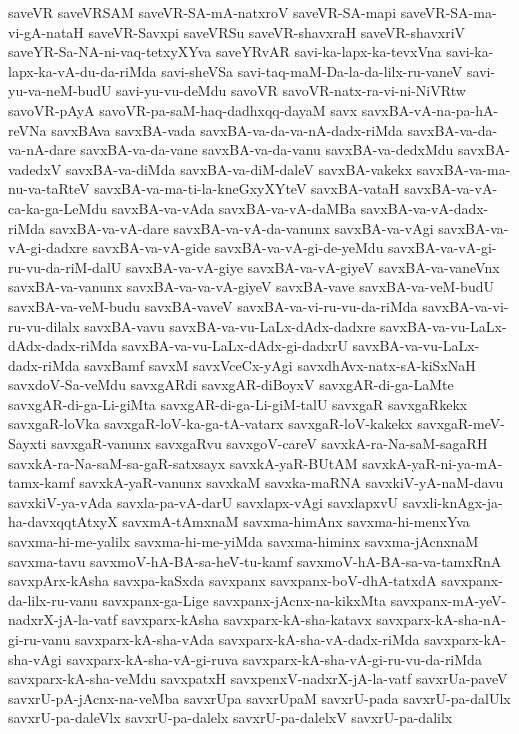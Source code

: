 {saveVR
saveVRSAM
saveVR-SA-mA-natxroV
saveVR-SA-mapi
saveVR-SA-ma-vi-gA-nataH
saveVR-Savxpi
saveVRSu
saveVR-shavxraH
saveVR-shavxriV
saveYR-Sa-NA-ni-vaq-tetxyXYva
saveYRvAR
savi-ka-lapx-ka-tevxVna
savi-ka-lapx-ka-vA-du-da-riMda
savi-sheVSa
savi-taq-maM-Da-la-da-lilx-ru-vaneV
savi-yu-va-neM-budU
savi-yu-vu-deMdu
savoVR
savoVR-natx-ra-vi-ni-NiVRtw
savoVR-pAyA
savoVR-pa-saM-haq-dadhxqq-dayaM
savx
savxBA-vA-na-pa-hA-reVNa
savxBAva
savxBA-vada
savxBA-va-da-va-nA-dadx-riMda
savxBA-va-da-va-nA-dare
savxBA-va-da-vane
savxBA-va-da-vanu
savxBA-va-dedxMdu
savxBA-vadedxV
savxBA-va-diMda
savxBA-va-diM-daleV
savxBA-vakekx
savxBA-va-ma-nu-va-taRteV
savxBA-va-ma-ti-la-kneGxyXYteV
savxBA-vataH
savxBA-va-vA-ca-ka-ga-LeMdu
savxBA-va-vAda
savxBA-va-vA-daMBa
savxBA-va-vA-dadx-riMda
savxBA-va-vA-dare
savxBA-va-vA-da-vanunx
savxBA-va-vAgi
savxBA-va-vA-gi-dadxre
savxBA-va-vA-gide
savxBA-va-vA-gi-de-yeMdu
savxBA-va-vA-gi-ru-vu-da-riM-dalU
savxBA-va-vA-giye
savxBA-va-vA-giyeV
savxBA-va-vaneVnx
savxBA-va-vanunx
savxBA-va-va-vA-giyeV
savxBA-vave
savxBA-va-veM-budU
savxBA-va-veM-budu
savxBA-vaveV
savxBA-va-vi-ru-vu-da-riMda
savxBA-va-vi-ru-vu-dilalx
savxBA-vavu
savxBA-va-vu-LaLx-dAdx-dadxre
savxBA-va-vu-LaLx-dAdx-dadx-riMda
savxBA-va-vu-LaLx-dAdx-gi-dadxrU
savxBA-va-vu-LaLx-dadx-riMda
savxBamf
savxM
savxVceCx-yAgi
savxdhAvx-natx-sA-kiSxNaH
savxdoV-Sa-veMdu
savxgARdi
savxgAR-diBoyxV
savxgAR-di-ga-LaMte
savxgAR-di-ga-Li-giMta
savxgAR-di-ga-Li-giM-talU
savxgaR
savxgaRkekx
savxgaR-loVka
savxgaR-loV-ka-ga-tA-vatarx
savxgaR-loV-kakekx
savxgaR-meV-Sayxti
savxgaR-vanunx
savxgaRvu
savxgoV-careV
savxkA-ra-Na-saM-sagaRH
savxkA-ra-Na-saM-sa-gaR-satxsayx
savxkA-yaR-BUtAM
savxkA-yaR-ni-ya-mA-tamx-kamf
savxkA-yaR-vanunx
savxkaM
savxka-maRNA
savxkiV-yA-naM-davu
savxkiV-ya-vAda
savxla-pa-vA-darU
savxlapx-vAgi
savxlapxvU
savxli-knAgx-ja-ha-davxqqtAtxyX
savxmA-tAmxnaM
savxma-himAnx
savxma-hi-menxYva
savxma-hi-me-yalilx
savxma-hi-me-yiMda
savxma-himinx
savxma-jAcnxnaM
savxma-tavu
savxmoV-hA-BA-sa-heV-tu-kamf
savxmoV-hA-BA-sa-va-tamxRnA
savxpArx-kAsha
savxpa-kaSxda
savxpanx
savxpanx-boV-dhA-tatxdA
savxpanx-da-lilx-ru-vanu
savxpanx-ga-Lige
savxpanx-jAcnx-na-kikxMta
savxpanx-mA-yeV-nadxrX-jA-la-vatf
savxparx-kAsha
savxparx-kA-sha-katavx
savxparx-kA-sha-nA-gi-ru-vanu
savxparx-kA-sha-vAda
savxparx-kA-sha-vA-dadx-riMda
savxparx-kA-sha-vAgi
savxparx-kA-sha-vA-gi-ruva
savxparx-kA-sha-vA-gi-ru-vu-da-riMda
savxparx-kA-sha-veMdu
savxpatxH
savxpenxV-nadxrX-jA-la-vatf
savxrUa-paveV
savxrU-pA-jAcnx-na-veMba
savxrUpa
savxrUpaM
savxrU-pada
savxrU-pa-dalUlx
savxrU-pa-daleVlx
savxrU-pa-dalelx
savxrU-pa-dalelxV
savxrU-pa-dalilx
}
